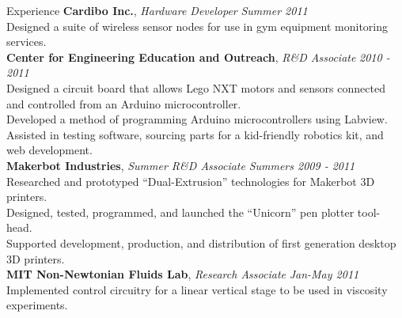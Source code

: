 \documentclass{resume} %
\begin{document}
\begin{rSection}{Experience}
{\bf Cardibo Inc.}, {\em Hardware Developer} \hfill {\em Summer 2011}
\\Designed a suite of wireless sensor nodes for use in gym equipment monitoring services.
\smallskip
\\{\bf Center for Engineering Education and Outreach}, {\em R\&D Associate} \hfill {\em 2010 - 2011}
\\Designed a circuit board that allows Lego NXT motors and sensors connected and controlled
from an Arduino microcontroller.
\\Developed a method of programming Arduino microcontrollers using Labview. Assisted in
testing software, sourcing parts for a kid-friendly robotics kit, and web development.
\smallskip
\\{\bf Makerbot Industries}, {\em Summer R\&D Associate} \hfill {\em Summers 2009 - 2011}
\\Researched and prototyped “Dual-Extrusion” technologies for Makerbot 3D printers.
\\Designed, tested, programmed, and launched the “Unicorn” pen plotter tool-head.
\\Supported development, production, and distribution of first generation desktop 3D printers.
\smallskip
\\{\bf MIT Non-Newtonian Fluids Lab}, {\em Research Associate} \hfill {\em Jan-May 2011}
\\Implemented control circuitry for a linear vertical stage to be used in viscosity experiments.

\end{rSection}
\newpage
\end{document}
